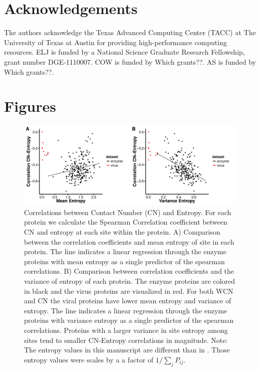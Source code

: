 \documentclass[12pt]{article}
\begin{document}
\section{Acknowledgements}
The authors acknowledge the Texas Advanced Computing Center (TACC) at The University of Texas at Austin for providing high-performance computing resources. ELJ is funded by a National Science Graduate Research Fellowship, grant number DGE-1110007. COW is funded by {\color{red} Which grants??}.  AS is funded by {\color{red} Which grants??}.


\cleardoublepage
\section*{Figures}

    \begin{figure}[H]
            \centerline{\includegraphics[width=7.5in]{entropy_cn_cor.pdf}}     
            \caption{Correlations between Contact Number (CN) and Entropy. For each protein we calculate the Spearman Correlation coefficient between CN and entropy at each site within the protein. A) Comparison between the correlation coefficients and mean entropy of site in each protein. The line indicates a linear regression through the enzyme proteins with mean entropy as a single predictor of the spearman correlations. B) Comparison between correlation coefficients and the variance of entropy of each protein. The enzyme proteins are colored in black and the virus proteins are visualized in red. For both WCN and CN the viral proteins have lower mean entropy and variance of entropy. The line indicates a linear regression through the enzyme proteins with variance entropy as a single predictor of the spearman correlations. Proteins with a larger variance in site entropy among sites tend to smaller CN-Entropy correlations in magnitude. Note: The entropy values in this manuscript are different than in \cite{Shahmoradietal2014}. Those entropy values were scales by a a factor of $1/\sum_j P_{ij}$. }
            \label{fig:entropy_cn_cor}
    \end{figure}
\end{document}
